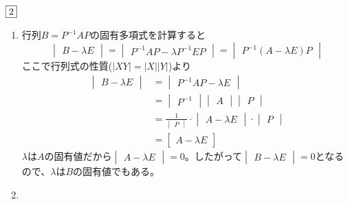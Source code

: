 \documentclass[dvipdfmx]{jsreport}
\newcounter{num}[section]
\begin{document}
\begin{answer} %
	$\fbox{2}$
\begin{enumerate}
	\item 行列$B= P^{-1}AP$の固有多項式を計算すると
\begin{equation*}
	\begin{vmatrix}B- \lambda E\end{vmatrix}= \begin{vmatrix}P^{-1}AP- \lambda P^{-1}EP\end{vmatrix}= \begin{vmatrix}P^{-1}(A- \lambda E)P\end{vmatrix}
\end{equation*}
	ここで行列式の性質($|XY|= |X||Y|$)より
\begin{align*}
	\begin{vmatrix}B- \lambda E\end{vmatrix}
	&= \begin{vmatrix}P^{-1}AP- \lambda E\end{vmatrix}\\
	&= \begin{vmatrix}P^{-1}\end{vmatrix}\begin{vmatrix}A\end{vmatrix}\begin{vmatrix}P\end{vmatrix}\\
	&= \frac{1}{\begin{vmatrix}P\end{vmatrix}}\cdot\begin{vmatrix}A- \lambda E\end{vmatrix}\cdot \begin{vmatrix}P\end{vmatrix}\\
	&= \begin{bmatrix}A- \lambda E\end{bmatrix}
\end{align*}
	$\lambda$は$A$の固有値だから$\begin{vmatrix}A- \lambda E\end{vmatrix}= 0$。したがって$\begin{vmatrix}B- \lambda E\end{vmatrix}= 0$となるので、$\lambda$は$B$の固有値でもある。
	\item 
{}
\end{enumerate}
\end{answer}
\end{document}
